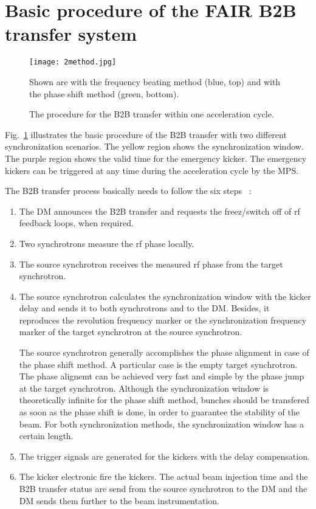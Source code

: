 \section{Basic procedure of the FAIR B2B transfer system}
\begin{figure}[H]
   \centering   
   \texttt{[image: 2method.jpg]}
   \caption{The procedure for the B2B transfer within one acceleration cycle.}{Shown are with the frequency beating method (blue, top) and with the phase shift method (green, bottom).}
   \label{2method}
\end{figure}
Fig.~\ref{2method} illustrates the basic procedure of the B2B transfer with two different synchronization scenarios. The yellow region shows the synchronization window. The purple region shows the valid time for the emergency kicker. The emergency kickers can be triggered at any time during the acceleration cycle by the MPS.  


The B2B transfer process basically needs to follow the six steps ~\cite{bai_bunch_2015}:
\begin{enumerate}
\item The DM announces the B2B transfer and requests the freez/switch off of rf feedback loops, when required.
\item Two synchrotrons measure the rf phase locally.
\item The source synchrotron receives the measured rf phase from the target synchrotron.
\item The source synchrotron calculates the synchronization window with the kicker delay and sends it to both synchrotrons and to the DM. Besides, it reproduces the revolution frequency marker or the synchronization frequency marker of the target synchrotron at the source synchrotron.

The source synchrotron generally accomplishes the phase alignment in case of the phase shift method. A particular case is the empty target synchrotron. The phase alignemt can be achieved very fast and simple by the phase jump at the target synchrotron. Although the synchronization window is theoretically infinite for the phase shift method, bunches should be transfered as soon as the phase shift is done, in order to guarantee the stability of the beam. For both synchronization methods, the synchronization window has a certain length.

\item The trigger signals are generated for the kickers with the delay compensation.
\item The kicker electronic fire the kickers. The actual beam injection time and the B2B transfer status are send from the source synchrotron to the DM and the DM sends them further to the beam instrumentation.

\end{enumerate}



